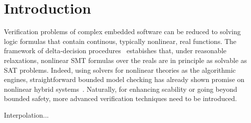 \section{Introduction}
\label{sec:intro}




Verification problems of complex embedded software can be reduced to solving logic formulas that contain continous, typically nonlinear, real functions. The framework of delta-decision procedures~\cite{DBLP:conf/lics/GaoAC12,DBLP:conf/fmcad/GaoKC13} estabishes that, under reasonable relaxations, nonlinear SMT formulas over the reals are in principle as solvable as SAT problems. Indeed, using solvers for nonlinear theories as the algorithmic engines, straightforward bounded model checking has already shown promise on nonlinear hybrid systems~\cite{}. Naturally, for enhancing scability or going beyond bounded safety, more advanced verification techniques need to be introduced. 

Interpolation...


